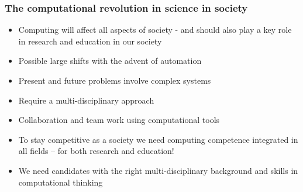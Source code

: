 \documentclass{beamer}
\begin{document}
\begin{frame}
\frametitle{The computational revolution in science in society}

\begin{block}{}
\begin{itemize}
\item Computing will affect all aspects of society - and should also play a key role in research and education in our society

\item Possible large shifts with the advent of automation
\end{itemize}

\noindent
\end{block}

\begin{block}{}
\begin{itemize}
\item Present and future problems involve complex systems

\item Require a multi-disciplinary approach

\item Collaboration and team work using computational tools
\end{itemize}

\noindent
\end{block}

\begin{block}{}
\begin{itemize}
\item To stay competitive as a society we need computing competence integrated in all fields – for both research and education!

\item We need candidates with the right multi-disciplinary background and skills in computational thinking
\end{itemize}

\noindent
\end{block}
\end{frame}
\end{document}
